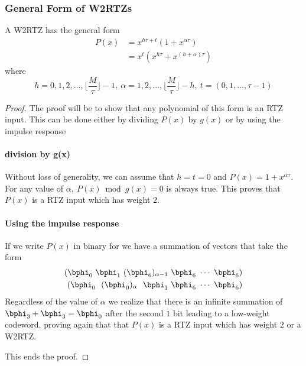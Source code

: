 \subsubsection{General Form of W2RTZs}
A W2RTZ has the general form
\begin{equation}
\begin{split}
P(x)&=x^{h\tau+t}(1+x^{\alpha \tau})\\
& = x^t(x^{h\tau}+x^{(h+\alpha)\tau})
\end{split}
\end{equation}
where
$$h=0,1,2,...,\Big\lfloor \frac{M}{\tau} \Big\rfloor-1,~
 \alpha=1,2,...,\Big\lfloor \frac{M}{\tau} \Big\rfloor-h,~
 t=(0,1,...,\tau-1)$$

\begin{proof}
The proof will be to show that any polynomial of this form is an RTZ input. This can be done either by dividing $P(x)$ by $g(x)$ or by using the impulse response
\paragraph{division by g(x)}
Without loss of generality, we can assume that $h=t=0$ and $P(x) = 1+x^{\alpha \tau}$.
For any value of $\alpha,~P(x) \bmod g(x) = 0$ is always true. This proves that $P(x)$ is a RTZ input which has weight $2$.

\paragraph{Using the impulse response}
If we write $P(x)$ in binary for we have a summation of vectors that take the form
\begin{eqnarray*}
(\bphi_0~\bphi_1~(\bphi_6)_{\alpha-1}~\bphi_6~\cdots~\bphi_6)\cr
(\bphi_0~~(\bphi_0)_{\alpha}~~\bphi_1~\bphi_6~\cdots~\bphi_6)
\end{eqnarray*}
Regardless of the value of $\alpha$ we realize that there is an infinite summation of $\bphi_3+\bphi_3=\bphi_0$ after the second $1$ bit leading to a low-weight codeword, proving again that that $P(x)$ is a RTZ input which has weight $2$ or a W2RTZ.

This ends the proof.
\end{proof}

